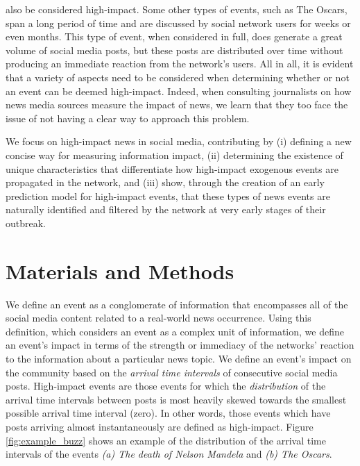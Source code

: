 \documentclass[10pt,letterpaper]{article}
\begin{document}
also be considered high-impact. Some other types of events, such as
The Oscars, span a long period of time and are discussed by social
network users for weeks or even months. This type of event, when
considered in full, does generate a great volume of social media
posts, but these posts are distributed over time without producing an
immediate reaction from the network's users. All in all, it is evident
that a variety of aspects need to be considered when determining
whether or not an event can be deemed high-impact. Indeed, when
consulting journalists on how news media sources measure the impact of
news, we learn that they too face the issue of not having a clear way
to approach this problem.


We focus on high-impact news in social media, contributing by (i)
defining a new concise way for measuring information impact, (ii)
determining the existence of unique characteristics that differentiate
how high-impact exogenous events are propagated in the network, and
(iii) show, through the creation of an early prediction model for
high-impact events, that these types of news events are naturally
identified and filtered by the network at very early stages of their
outbreak.



\section*{Materials and Methods}
We define an event as a conglomerate of information that encompasses
all of the social media content related to a real-world news
occurrence. Using this definition, which considers an event as a
complex unit of information, we define an event's impact in terms of
the strength or immediacy of the networks' reaction to the information
about a particular news topic. We define an event's impact on the
community based on the \emph{arrival time intervals} of consecutive
social media posts.
High-impact events are those events for which the \emph{distribution}
of the arrival time intervals between posts is most heavily skewed
towards the smallest possible arrival time interval (zero). In other
words, those events which have posts arriving almost instantaneously
are defined as high-impact. Figure \ref{fig:example_buzz} shows an
example of the distribution of the arrival time intervals of the
events {\em (a) The death of Nelson Mandela} and {\em (b) The Oscars}.
\end{document}
